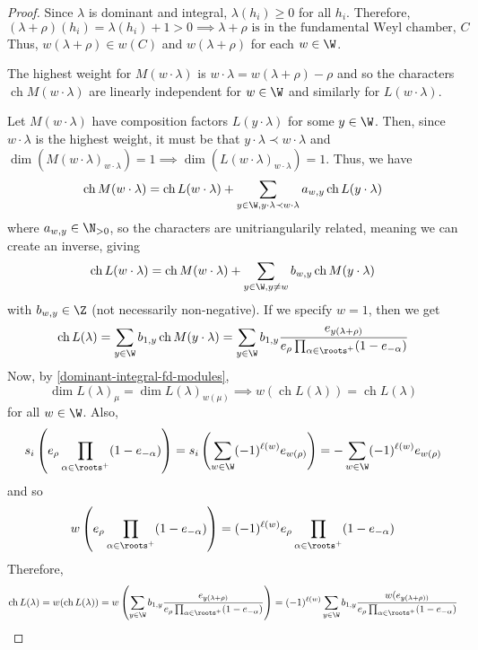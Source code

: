 \documentclass[11pt,leqno,oneside]{amsart}
\numberwithin{thm}{section}
\newcommand{\ch}{\operatorname{ch}}
\newcommand{\halfsum}{\rho}
\begin{document}
\begin{proof}
  Since \(\lambda\) is dominant and integral, \(\lambda(h_i) \geq 0\)
  for all \(h_i\). Therefore, \[
    (\lambda + \halfsum)(h_i) = \lambda(h_i)+1 > 0 \implies
    \lambda+\halfsum \text{ is in the fundamental Weyl chamber, }C
  \]
  Thus, \(w(\lambda+\halfsum) \in w(C)\) and \(w(\lambda+\halfsum)\)
  for each \(w \in \W\).

  The highest weight for \(M(w \cdot \lambda)\) is \(w \cdot \lambda =
  w(\lambda+\halfsum)-\halfsum\) and so the characters \(\ch M(w\cdot
  \lambda)\) are linearly independent for \(w \in \W\) and similarly
  for \(L(w \cdot \lambda)\).

  Let \(M(w \cdot \lambda)\) have composition factors \(L(y \cdot
  \lambda)\) for some \(y \in \W\). Then, since \(w \cdot \lambda\) is
  the highest weight, it must be that \(y \cdot \lambda \prec w \cdot
  \lambda\) and \(\dim(M(w\cdot\lambda)_{w \cdot \lambda}) = 1
  \implies \dim(L(w\cdot\lambda)_{w \cdot \lambda}) = 1\). Thus, we
  have \[
    \ch M(w \cdot \lambda) = \ch L(w \cdot \lambda) + \sum_{y \in \W,
      y \cdot \lambda \prec w \cdot \lambda} a_{w,y} \ch L(y \cdot \lambda)
  \]
  where \(a_{w,y} \in \N_{>0}\), so the characters are
  unitriangularily related, meaning we can create an inverse,
  giving \[
    \ch L(w \cdot \lambda) = \ch M(w \cdot \lambda) + \sum_{y \in \W,
      y\neq w} b_{w,y} \ch M(y \cdot \lambda)
  \]
  with \(b_{w,y} \in \Z\) (not necessarily non-negative). If we
  specify \(w = 1\), then we get \[
    \ch L(\lambda) = \sum_{y \in \W} b_{1,y} \ch M(y \cdot \lambda) =
    \sum_{y \in \W} b_{1,y} \frac{e_{y(\lambda + \halfsum)}}{e_{\halfsum}
    \prod_{\alpha \in \roots^+}(1-e_{-\alpha})}
  \] Now, by \ref{dominant-integral-fd-modules}, \[
    \dim L(\lambda)_\mu = \dim L(\lambda)_{w(\mu)} \implies w(\ch
    L(\lambda)) = \ch L(\lambda)
  \]
  for all \(w \in \W\). Also, \[
    s_i\left( e_{\halfsum} \prod_{\alpha \in \roots^+}(1-e_{-\alpha})
    \right) = s_i\left( \sum_{w \in \W} (-1)^{\ell(w)}e_{w(\halfsum)}
    \right) = -\sum_{w\in \W}(-1)^{\ell(w)}e_{w(\halfsum)}
  \]
  and so \[
    w\left(   e_{\halfsum} \prod_{\alpha \in \roots^+}(1-e_{-\alpha})
    \right) = (-1)^{\ell(w)}  e_{\halfsum} \prod_{\alpha \in \roots^+}(1-e_{-\alpha})
  \]
  Therefore, \[
    \ch L(\lambda) = w(\ch L(\lambda)) = w\left( \sum_{y \in \W} b_{1,y} \frac{e_{y(\lambda + \halfsum)}}{e_{\halfsum}
    \prod_{\alpha \in \roots^+}(1-e_{-\alpha})}
  \right) = (-1)^{\ell(w)} \sum_{y \in \W} b_{1,y} \frac{w(e_{y(\lambda + \halfsum))}}{e_{\halfsum}
    \prod_{\alpha \in \roots^+}(1-e_{-\alpha})} 
\]
\end{proof}
\end{document}
